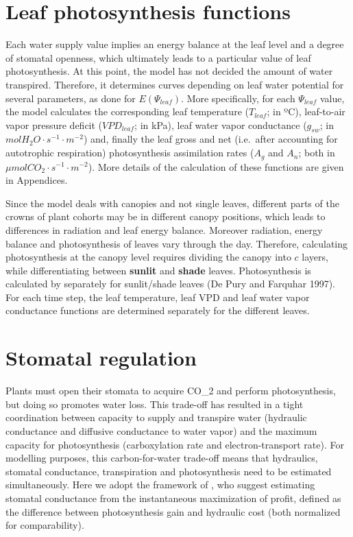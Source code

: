 \documentclass[]{book}
\begin{document}
\hypertarget{leaf-photosynthesis-functions}{%
\section{Leaf photosynthesis functions}\label{leaf-photosynthesis-functions}}

Each water supply value implies an energy balance at the leaf level and a degree of stomatal openness, which ultimately leads to a particular value of leaf photosynthesis. At this point, the model has not decided the amount of water transpired. Therefore, it determines curves depending on leaf water potential for several parameters, as done for \(E(\Psi_{leaf})\). More specifically, for each \(\Psi_{leaf}\) value, the model calculates the corresponding leaf temperature (\(T_{leaf}\); in ºC), leaf-to-air vapor pressure deficit (\(VPD_{leaf}\); in kPa), leaf water vapor conductance (\(g_{sw}\); in \(mol H_2O·s^{-1}·m^{-2}\)) and, finally the leaf gross and net (i.e.~after accounting for autotrophic respiration) photosynthesis assimilation rates (\(A_g\) and \(A_n\); both in \(\mu mol CO_2·s^{-1}·m^{-2}\)). More details of the calculation of these functions are given in Appendices.

Since the model deals with canopies and not single leaves, different parts of the crowns of plant cohorts may be in different canopy positions, which leads to differences in radiation and leaf energy balance. Moreover radiation, energy balance and photosynthesis of leaves vary through the day. Therefore, calculating photosynthesis at the canopy level requires dividing the canopy into \(c\) layers, while differentiating between \textbf{sunlit} and \textbf{shade} leaves. Photosynthesis is calculated by separately for sunlit/shade leaves (De Pury and Farquhar 1997). For each time step, the leaf temperature, leaf VPD and leaf water vapor conductance functions are determined separately for the different leaves.

\hypertarget{stomatal-regulation-1}{%
\section{Stomatal regulation}\label{stomatal-regulation-1}}

Plants must open their stomata to acquire CO\_2 and perform photosynthesis, but doing so promotes water loss. This trade-off has resulted in a tight coordination between capacity to supply and transpire water (hydraulic conductance and diffusive conductance to water vapor) and the maximum capacity for photosynthesis (carboxylation rate and electron-transport rate). For modelling purposes, this carbon-for-water trade-off means that hydraulics, stomatal conductance, transpiration and photosynthesis need to be estimated simultaneously. Here we adopt the framework of \citet{Sperry2016}, who suggest estimating stomatal conductance from the instantaneous maximization of profit, defined as the difference between photosynthesis gain and hydraulic cost (both normalized for comparability).
\end{document}
